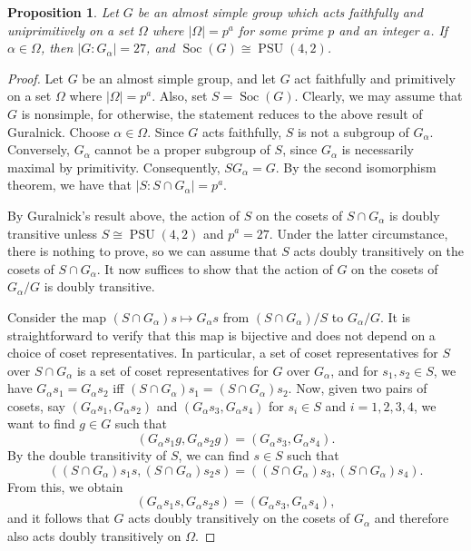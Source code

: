 \documentclass[12pt]{amsart}
\newtheorem{proposition}[theorem]{Proposition}
\theoremstyle{definition}
\DeclareMathOperator{\PSU}{PSU}
\DeclareMathOperator{\Soc}{Soc}
\begin{document}
\begin{proposition}
	Let $G$ be an almost simple group which acts faithfully and uniprimitively on a set $\Omega$ where $|\Omega| = p^a$ for some prime $p$ and an integer $a$. If $\alpha \in \Omega$, then $|G:G_\alpha| = 27$, and $\Soc(G) \cong \PSU(4,2)$.
\end{proposition}	
\begin{proof}
	Let $G$ be an almost simple group, and let $G$ act faithfully and primitively on a set $\Omega$ where $|\Omega| = p^a$. Also, set $S = \Soc(G)$. Clearly, we may assume that $G$ is nonsimple, for otherwise, the statement reduces to the above result of Guralnick. Choose $\alpha \in \Omega$. Since $G$ acts faithfully, $S$ is not a subgroup of $G_\alpha$. Conversely, $G_\alpha$ cannot be a proper subgroup of $S$, since $G_\alpha$ is necessarily maximal by primitivity. Consequently, $SG_\alpha = G$. By the second isomorphism theorem, we have that \newline $|S:S\cap G_\alpha| = p^a$. 
	
	By Guralnick's result above, the action of $S$ on the cosets of $S \cap G_\alpha$ is doubly transitive unless $S \cong \PSU(4,2)$ and $p^a = 27$. Under the latter circumstance, there is nothing to prove, so we can assume that $S$ acts doubly transitively on the cosets of $S \cap G_\alpha$. It now suffices to show that the action of $G$ on the cosets of $G_\alpha/G$ is doubly transitive.
	
	Consider the map $(S \cap G_\alpha)s \longmapsto G_\alpha s$ from $(S \cap G_\alpha)/S$ to $G_\alpha/G$. It is straightforward to verify that this map is bijective and does not depend on a choice of coset representatives. In particular, a set of coset representatives for $S$ over $S \cap G_\alpha$ is a set of coset representatives for $G$ over $G_\alpha$, and for $s_1, s_2 \in S$, we have $G_\alpha s_1 = G_\alpha s_2$ iff $(S \cap G_\alpha)s_1 = (S \cap G_\alpha)s_2$.  Now, given two pairs of cosets, say $(G_\alpha s_1, G_\alpha s_2)$ and $(G_\alpha s_3, G_\alpha s_4)$ for $s_i \in S$ and $i=1, 2, 3, 4$, we want to find $g \in G$ such that 
	$$
		(G_\alpha s_1 g, G_\alpha s_2 g) = (G_\alpha s_3, G_\alpha s_4).
	$$
	By the double transitivity of $S$, we can find $s \in S$ such that
	$$
		((S \cap G_\alpha) s_1 s, (S \cap G_\alpha) s_2 s) = ((S \cap G_\alpha) s_3, (S \cap G_\alpha) s_4).
	$$
	From this, we obtain
	$$
		(G_\alpha s_1 s, G_\alpha s_2 s) = (G_\alpha s_3, G_\alpha s_4),
	$$
	and it follows that $G$ acts doubly transitively on the cosets of $G_\alpha$ and therefore also acts doubly transitively on $\Omega$.
\end{proof}
	
\end{document}
